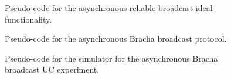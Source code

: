 \begin{figure}
\centering
	
	\caption{Pseudo-code for the asynchronous reliable broadcast ideal functionality.}
	\label{fig:f_rbc}
\end{figure}

\begin{figure}
\centering
	
	\caption{Pseudo-code for the asynchronous Bracha broadcast protocol.}
	\label{fig:prot_bracha_async}
\end{figure}

\begin{figure}
\centering
	
	\caption{Pseudo-code for the simulator for the asynchronous Bracha broadcast UC experiment.}
	\label{fig:sim_bracha_async}
\end{figure}

